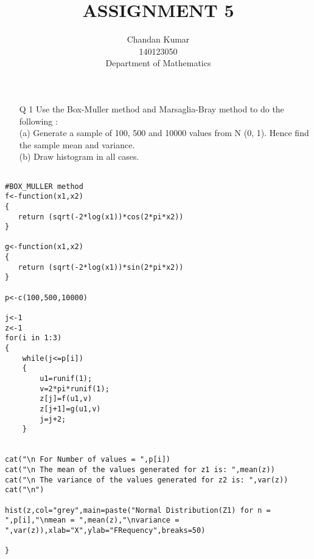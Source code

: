 \documentclass[11pt]{article}
\title{ASSIGNMENT 5 }
\author{Chandan Kumar\\140123050\\Department of Mathematics}
\begin{document}
\titlepage
\newpage

\begin{enumerate}
\item[Q 1]  Use the Box-Muller method and Marsaglia-Bray method to do the following :\\
(a) Generate a sample of 100, 500 and 10000 values from N (0, 1). Hence find the
sample mean and variance.\\
(b) Draw histogram in all cases.
\end{enumerate}


\begin{lstlisting}

#BOX_MULLER method
f<-function(x1,x2)
{
   return (sqrt(-2*log(x1))*cos(2*pi*x2))
}

g<-function(x1,x2)
{
   return (sqrt(-2*log(x1))*sin(2*pi*x2))
}

p<-c(100,500,10000)

j<-1
z<-1
for(i in 1:3)
{	
	while(j<=p[i])
	{
		u1=runif(1);
		v=2*pi*runif(1);
  		z[j]=f(u1,v)
 		z[j+1]=g(u1,v)
 		j=j+2;	
	}


cat("\n For Number of values = ",p[i])
cat("\n The mean of the values generated for z1 is: ",mean(z))
cat("\n The variance of the values generated for z2 is: ",var(z))
cat("\n")
	
hist(z,col="grey",main=paste("Normal Distribution(Z1) for n =   ",p[i],"\nmean = ",mean(z),"\nvariance = ",var(z)),xlab="X",ylab="FRequency",breaks=50)
		
}


\end{lstlisting}
\end{document}
